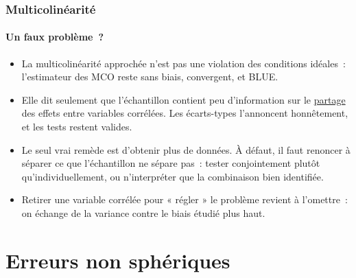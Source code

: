 \documentclass[10pt]{beamer}
\begin{document}
\begin{frame}
  \frametitle{Multicolinéarité}
  \framesubtitle{Un faux problème~?}

  \begin{itemize}

  \item[\dbend] La multicolinéarité approchée n'est pas une violation des conditions
    idéales~: l'estimateur des MCO reste sans biais, convergent, et BLUE.\newline

  \item Elle dit seulement que l'échantillon contient peu d'information sur le
    \underline{partage} des effets entre variables corrélées. Les écarts-types
    l'annoncent honnêtement, et les tests restent valides.\newline

  \item Le seul vrai remède est d'obtenir plus de données. À défaut, il faut renoncer
    à séparer ce que l'échantillon ne sépare pas~: tester conjointement plutôt
    qu'individuellement, ou n'interpréter que la combinaison bien identifiée.\newline

  \item[\dbend] Retirer une variable corrélée pour « régler » le problème revient à
    l'omettre~: on échange de la variance contre le biais étudié plus haut.

  \end{itemize}

\end{frame}


\section{Erreurs non sphériques}
\end{document}
